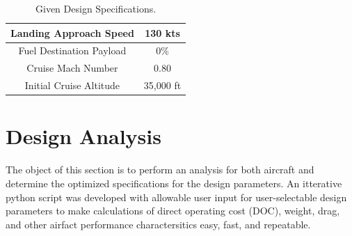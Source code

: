 \documentclass{article}
\begin{document}
\begin{table}[ht]
\begin{tabular}{|c|c|}
            Landing Approach Speed                & 130 kts                          \\ \hline
            \rowcolor[HTML]{C0C0C0}
            Fuel Destination Payload              & 0\%                              \\ \hline
            Cruise Mach Number                    & 0.80                             \\ \hline
            \rowcolor[HTML]{C0C0C0}
            Initial Cruise Altitude               & 35,000 ft                        \\ \hline
        \end{tabular}
        \caption{Given Design Specifications.}
    \end{table}

    \section{Design Analysis}
    \label{sec:design}
    \begin{flushleft}
        The object of this section is to perform an analysis for both aircraft
        and determine the optimized specifications for the design parameters. An
        itterative python script was developed with allowable user input for
        user-selectable design parameters to make calculations of direct
        operating cost (DOC), weight, drag, and other airfact performance
        charactersitics easy, fast, and repeatable.
    \end{flushleft}
\end{document}
